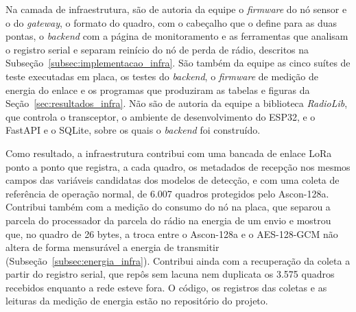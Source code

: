 Na camada de infraestrutura, são de autoria da equipe o \textit{firmware} do nó sensor e o do \textit{gateway}, o formato do quadro, com o cabeçalho que o define para as duas pontas, o \textit{backend} com a página de monitoramento e as ferramentas que analisam o registro serial e separam reinício do nó de perda de rádio, descritos na Subseção~\ref{subsec:implementacao_infra}. São também da equipe as cinco suítes de teste executadas em placa, os testes do \textit{backend}, o \textit{firmware} de medição de energia do enlace e os programas que produziram as tabelas e figuras da Seção~\ref{sec:resultados_infra}. Não são de autoria da equipe a biblioteca \textit{RadioLib}, que controla o transceptor, o ambiente de desenvolvimento do ESP32, e o FastAPI e o SQLite, sobre os quais o \textit{backend} foi construído.

Como resultado, a infraestrutura contribui com uma bancada de enlace LoRa ponto a ponto que registra, a cada quadro, os metadados de recepção nos mesmos campos das variáveis candidatas dos modelos de detecção, e com uma coleta de referência de operação normal, de 6.007 quadros protegidos pelo Ascon-128a. Contribui também com a medição do consumo do nó na placa, que separou a parcela do processador da parcela do rádio na energia de um envio e mostrou que, no quadro de 26 bytes, a troca entre o Ascon-128a e o AES-128-GCM não altera de forma mensurável a energia de transmitir (Subseção~\ref{subsec:energia_infra}). Contribui ainda com a recuperação da coleta a partir do registro serial, que repôs sem lacuna nem duplicata os 3.575 quadros recebidos enquanto a rede esteve fora. O código, os registros das coletas e as leituras da medição de energia estão no repositório do projeto.

